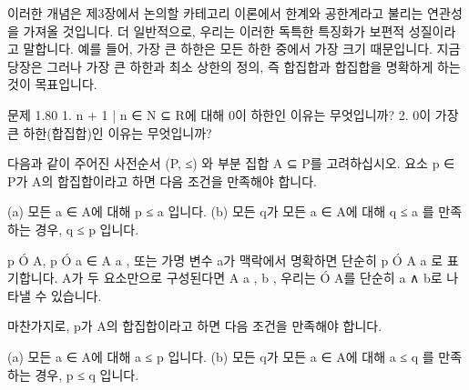\documentclass[11pt, a4paper, twoside, openany]{book}
\begin{document}
\par\medskip
이러한 개념은 제\hspace{0pt}3\hspace{0pt}장에서 논의할 카테고리 이론에서 한계와 공한계라고 불리는 연관성을 가져올 것입니다. 더 일반적으로, 우리는 이러한 독특한 특징화가 보편적 성질이라고 말합니다. 예를 들어, 가장 큰 하한은 모든 하한 중에서 가장 크기 때문입니다. 지금 당장은 그러나 가장 큰 하한과 최소 상한의 정의, 즉 합집합과 합집합을 명확하게 하는 것이 목표입니다.

\par\medskip
문제 1.80
1. {n + 1 | n ∈ N} ⊆ R\hspace{0pt}에 대해 0\hspace{0pt}이 하한인 이유는 무엇입니까?
2. 0\hspace{0pt}이 가장 큰 하한(합집합)인 이유는 무엇입니까?

\par\medskip
\begin{definitionbox}[정의 1.81]
다음과 같이 주어진 사전순서 (P, ≤) 와 부분 집합 A ⊆ P\hspace{0pt}를 고려하십시오. 요소 p ∈ P\hspace{0pt}가 A\hspace{0pt}의 합집합이라고 하면 다음 조건을 만족해야 합니다.
\end{definitionbox}

\par\medskip
(a) 모든 a ∈ A\hspace{0pt}에 대해 p ≤ a 입니다.
(b) 모든 q\hspace{0pt}가 모든 a ∈ A\hspace{0pt}에 대해 q ≤ a 를 만족하는 경우, q ≤ p 입니다.

\par\medskip
p  Ó A, p  Ó
a ∈ A a , 또는 가명 변수 a\hspace{0pt}가 맥락에서 명확하면 단순히 p  Ó A a 로 표기합니다. A\hspace{0pt}가 두 요소만으로 구성된다면 A  { a , b } , 우리는  Ó A\hspace{0pt}를 단순히 a ∧ b\hspace{0pt}로 나타낼 수 있습니다.

\par\medskip
마찬가지로, p\hspace{0pt}가 A\hspace{0pt}의 합집합이라고 하면 다음 조건을 만족해야 합니다.

\par\medskip
(a) 모든 a ∈ A\hspace{0pt}에 대해 a ≤ p 입니다.
(b) 모든 q\hspace{0pt}가 모든 a ∈ A\hspace{0pt}에 대해 a ≤ q 를 만족하는 경우, p ≤ q 입니다.
\end{document}
